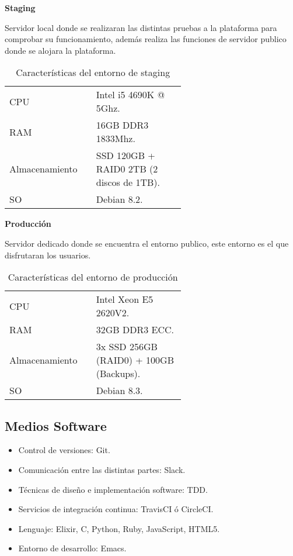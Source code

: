 \documentclass{pre-tfg}
\begin{document}
\begin{itemize}
\textbf{Staging}

Servidor local donde se realizaran las distintas pruebas a la plataforma para comprobar su
funcionamiento, además realiza las funciones de servidor publico donde se alojara la
plataforma.

\begin{table}[hp]
  \caption{Características del entorno de staging}
  \centering

  \begin{tabular}{p{0.2\linewidth}p{0.4\linewidth}}
    CPU& Intel i5 4690K @ 5Ghz.\\
    RAM& 16GB DDR3 1833Mhz.\\
    Almacenamiento& SSD 120GB + RAID0 2TB (2 discos de 1TB).\\
    SO& Debian 8.2.\\
  \end{tabular}
\end{table}

\textbf{Producción}

Servidor dedicado donde se encuentra el entorno publico, este entorno es el que
disfrutaran los usuarios.

\begin{table}[hp]
  \caption{Características del entorno de producción}
  \centering

  \begin{tabular}{p{0.2\linewidth}p{0.4\linewidth}}
    CPU& Intel Xeon E5 2620V2.\\
    RAM& 32GB DDR3 ECC.\\
    Almacenamiento& 3x SSD 256GB (RAID0) + 100GB (Backups).\\
    SO& Debian 8.3.\\
  \end{tabular}
\end{table}

\clearpage
\subsection{Medios Software}

\begin{itemize}
\item Control de versiones: Git.
\item Comunicación entre las distintas partes: Slack.
\item Técnicas de diseño e implementación software: TDD.
\item Servicios de integración continua: TravisCI ó CircleCI.
\item Lenguaje: Elixir, C, Python, Ruby, JavaScript, HTML5.
\item Entorno de desarrollo: Emacs.
\end{itemize}


\end{itemize}
\end{document}
